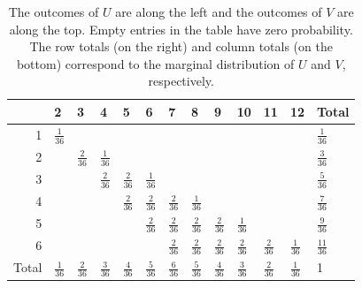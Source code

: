 \documentclass[captions=tableheading]{scrbook}
\begin{document}
\begin{example}
\begin{table}[htb]
\caption[The joint PMF of \((U,V)\)]{The outcomes of \(U\) are along the left and the outcomes of \(V\) are along the top. Empty entries in the table have zero probability. The row totals (on the right) and column totals (on the bottom) correspond to the marginal distribution of \(U\) and \(V\), respectively.} \label{tab-max-sum-joint-pmf}
\begin{center}
\begin{tabular}{r|lllllllllll|l}
        &  2                 &  3                 &  4                 &  5                 &  6                 &  7                 &  8                 &  9                 &  10                &  11                &  12                &  Total              \\
\hline
     1  &  \(\frac{1}{36}\)  &                    &                    &                    &                    &                    &                    &                    &                    &                    &                    &  \(\frac{1}{36}\)   \\
     2  &                    &  \(\frac{2}{36}\)  &  \(\frac{1}{36}\)  &                    &                    &                    &                    &                    &                    &                    &                    &  \(\frac{3}{36}\)   \\
     3  &                    &                    &  \(\frac{2}{36}\)  &  \(\frac{2}{36}\)  &  \(\frac{1}{36}\)  &                    &                    &                    &                    &                    &                    &  \(\frac{5}{36}\)   \\
     4  &                    &                    &                    &  \(\frac{2}{36}\)  &  \(\frac{2}{36}\)  &  \(\frac{2}{36}\)  &  \(\frac{1}{36}\)  &                    &                    &                    &                    &  \(\frac{7}{36}\)   \\
     5  &                    &                    &                    &                    &  \(\frac{2}{36}\)  &  \(\frac{2}{36}\)  &  \(\frac{2}{36}\)  &  \(\frac{2}{36}\)  &  \(\frac{1}{36}\)  &                    &                    &  \(\frac{9}{36}\)   \\
     6  &                    &                    &                    &                    &                    &  \(\frac{2}{36}\)  &  \(\frac{2}{36}\)  &  \(\frac{2}{36}\)  &  \(\frac{2}{36}\)  &  \(\frac{2}{36}\)  &  \(\frac{1}{36}\)  &  \(\frac{11}{36}\)  \\
\hline
 Total  &  \(\frac{1}{36}\)  &  \(\frac{2}{36}\)  &  \(\frac{3}{36}\)  &  \(\frac{4}{36}\)  &  \(\frac{5}{36}\)  &  \(\frac{6}{36}\)  &  \(\frac{5}{36}\)  &  \(\frac{4}{36}\)  &  \(\frac{3}{36}\)  &  \(\frac{2}{36}\)  &  \(\frac{1}{36}\)  &  1                  \\
\end{tabular}
\end{center}
\end{table}



\end{example}
\end{document}
